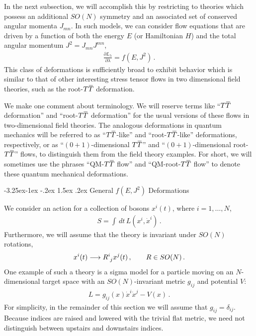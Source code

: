 \documentclass[12pt]{article}
\makeatletter
\numberwithin{equation}{section}
\renewcommand\subsection{\@startsection{subsection}{2}{\z@}%
                                     {-3.25ex\@plus -1ex \@minus -.2ex}%
                                     {1.5ex \@plus .2ex}%
                                     {\normalfont\bfseries}}
\newcommand{\overbar}[1]{\mkern 1.5mu\overline{\mkern-1.5mu#1\mkern-1.5mu}\mkern 1.5mu}
\def\TT{{T\overbar{T}}}
\makeatother
\begin{document}
In the next subsection, we will accomplish this by restricting to theories which possess an additional $SO(N)$ symmetry and an associated set of conserved angular momenta $J_{mn}$. In such models, we can consider flow equations that are driven by a function of both the energy $E$ (or Hamiltonian $H$) and the total angular momentum $J^2 = J_{mn} J^{mn}$,
%
\begin{align}
    \frac{\partial L_\lambda}{\partial \lambda} = f ( E , J^2 ) \, .
\end{align}
%
This class of deformations is sufficiently broad to exhibit behavior which is similar to that of other interesting stress tensor flows in two dimensional field theories, such as the root-$\TT$ deformation.

We make one comment about terminology. We will reserve terms like ``$\TT$ deformation'' and ``root-$\TT$ deformation'' for the usual versions of these flows in two-dimensional field theories. The analogous deformations in quantum mechanics will be referred to as ``$\TT$-like'' and ``root-$\TT$-like'' deformations, respectively, or as ``$(0+1)$-dimensional $\TT$'' and ``$(0+1)$-dimensional root-$\TT$'' flows, to distinguish them from the field theory examples. For short, we will sometimes use the phrases ``QM-$\TT$ flow'' and ``QM-root-$\TT$ flow'' to denote these quantum mechanical deformations.


\subsection{General $f ( E , J^2 )$ Deformations}\label{sec:general_f_H_J2}

We consider an action for a collection of bosons $x^i ( t )$, where $i = 1 , \ldots , N$,
%
\begin{align}
    S = \int \, dt \, L (  x^i , \dot{x}^i  ) \, .
\end{align}
%
Furthermore, we will assume that the theory is invariant under $SO(N)$ rotations,
%
\begin{align}
    x^i ( t ) \longrightarrow \tensor{R}{^i_j} x^j ( t ) \, , \qquad R \in SO ( N ) \, .
\end{align}
%
One example of such a theory is a sigma model for a particle moving on an $N$-dimensional target space with an $SO(N)$-invariant metric $g_{ij}$ and potential $V$:
%
\begin{align}
    L = g_{ij} ( x ) \dot{x}^i \dot{x}^j - V \left( x \right) \, .
\end{align}
%
For simplicity, in the remainder of this section we will assume that $g_{ij} = \delta_{ij}$. Because indices are raised and lowered with the trivial flat metric, we need not distinguish between upstairs and downstairs indices.
\end{document}
